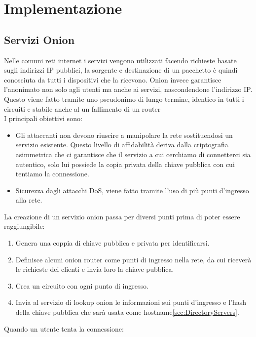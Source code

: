 \chapter{Implementazione}

\section{Servizi Onion}
Nelle comuni reti internet i servizi vengono utilizzati facendo richieste basate sugli indirizzi IP pubblici, la sorgente e destinazione di un pacchetto è quindi conosciuta da tutti i dispositivi che la ricevono. 
Onion invece garantisce l'anonimato non solo agli utenti ma anche ai servizi, nascondendone l'indirizzo IP. 
Questo viene fatto tramite uno pseudonimo di lungo termine, identico in tutti i circuiti e stabile anche al un fallimento di un router \\
I principali obiettivi sono:
\begin{itemize}
    \item Gli attaccanti non devono riuscire a manipolare la rete sostituendosi un servizio esistente. Questo livello di affidabilità deriva dalla criptografia asimmetrica che ci garantisce che il servizio a cui cerchiamo di connetterci sia autentico, solo lui possiede la copia privata della chiave pubblica con cui tentiamo la connessione.
    \item Sicurezza dagli attacchi DoS, viene fatto tramite l'uso di più punti d'ingresso alla rete.
\end{itemize}
La creazione di un servizio onion passa per diversi punti prima di poter essere raggiungibile:
\begin{enumerate}
    \item Genera una coppia di chiave pubblica e privata per identificarsi.
    \item Definisce alcuni onion router come punti di ingresso nella rete, da cui riceverà le richieste dei clienti e invia loro la chiave pubblica.
    \item Crea un circuito con ogni punto di ingresso.
    \item Invia al servizio di lookup onion le informazioni sui punti d'ingresso e l'hash della chiave pubblica che sarà usata come hostname\ref{sec:DirectoryServers}.
\end{enumerate}
Quando un utente tenta la connessione:
